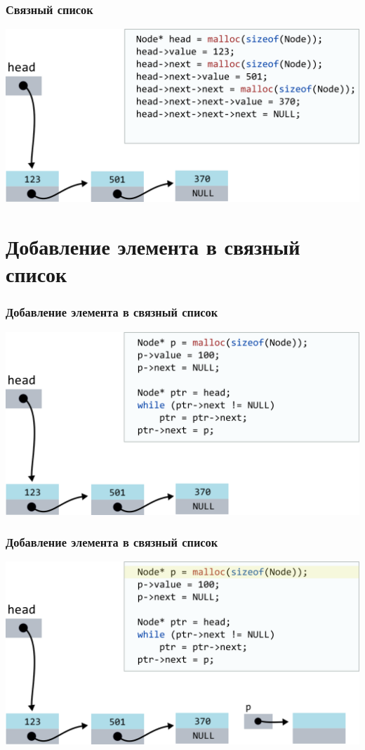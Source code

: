 \documentclass[10pt,pdf,hyperref={unicode}]{beamer}
\begin{document}
\begin{frame}[fragile]
\frametitle{Связный список}
\begin{center}
\includegraphics[scale=0.6]{images/list/codelist7.png}
\end{center}
\end{frame}

\section{Добавление элемента в связный список}

\begin{frame}[fragile]
\frametitle{Добавление элемента в связный список}
\begin{center}
\includegraphics[scale=0.6]{images/list/codelistf_insert1.png}
\end{center}
\end{frame}


\begin{frame}[fragile]
\frametitle{Добавление элемента в связный список}
\begin{center}
\includegraphics[scale=0.6]{images/list/codelistf_insert2.png}
\end{center}
\end{frame}
\end{document}
